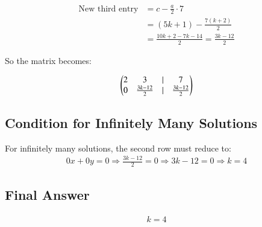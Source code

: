 \documentclass{article}
\begin{document}
\begin{align}
\text{New third entry} &= c - \frac{a}{2} \cdot 7 \\
&= (5k + 1) - \frac{7(k + 2)}{2} \\
&= \frac{10k + 2 - 7k - 14}{2} = \frac{3k - 12}{2}
\end{align}

So the matrix becomes:

\begin{align}
\begin{pmatrix}2 & 3 & \vert & 7 \\
0 & \frac{3k - 12}{2} & \vert & \frac{3k - 12}{2}\end{pmatrix}
\end{align}


\subsection*{Condition for Infinitely Many Solutions}

For infinitely many solutions, the second row must reduce to:
\begin{align}
0x + 0y = 0
\Rightarrow \frac{3k - 12}{2} = 0
\Rightarrow 3k - 12 = 0
\Rightarrow k = 4
\end{align}


\subsection*{Final Answer}

\begin{align}
\boxed{k = 4}
\end{align}
\end{document}
